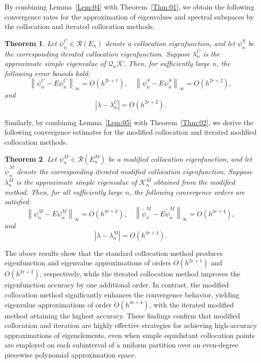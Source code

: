 \documentclass[]{interact}
\theoremstyle{plain}%
\newtheorem{theorem}{Theorem}[section]
\theoremstyle{definition}
\theoremstyle{remark}
\newcommand{\norm}[1]{\left\lVert #1\right\rVert}
\begin{document}
By combining Lemma~\ref{Lem:04} with Theorem~\ref{Thm:01},  we obtain the following convergence rates for the approximation of eigenvalues and spectral subspaces by the collocation and iterated collocation methods.
\begin{theorem} \label{thm1}
	Let \(\psi_n^C \in \mathcal{R}(E_n)\) denote a collocation eigenfunction, and let \(\psi_n^S\) be the corresponding iterated collocation eigenfunction. Suppose \(\lambda_n^C\) is the approximate simple eigenvalue of \(\mathcal{Q}_n\mathcal{K}\). Then, for sufficiently large \(n\), the following error bounds hold:
	\[	
	\norm{\psi_n^C - E\psi_n^C  }_{\infty} = O\left(h^{2r +1}\right), \quad 	\norm{\psi_n^S - E\psi_n^S  }_{\infty} = O\left(h^{2r +2}\right),
	\]
	and
	\[	
	|\lambda - \lambda_n^C| = O\left(h^{2r +2}\right).
	\]
\end{theorem}

Similarly, by combining Lemma~\ref{Lem:05} with Theorem~\ref{Thm:02}, we derive the following convergence estimates for the modified collocation and iterated modified collocation methods.
\begin{theorem} \label{thm2}
	Let \(\psi_n^M \in \mathcal{R}(E_n^M)\) be a modified collocation eigenfunction, and let \(\widetilde{\psi}_n^M\) denote the corresponding iterated modified collocation eigenfunction. Suppose \(\lambda_n^M\) is the approximate simple eigenvalue of \(\mathcal{K}_n^M\) obtained from the modified method. Then, for all sufficiently large \(n\), the following convergence orders are satisfied:
	\[	
	\norm{\psi_n^M - E\psi_n^M }_{\infty}  = O\left(h^{4r+3}\right), \quad 	\norm{\widetilde{\psi}_n^M - E\widetilde{\psi}_n^M }_{\infty} = O\left(h^{4r+4}\right),
	\]
	and
	\[
	|\lambda - \lambda_n^M| = O\left(h^{4r+4}\right).
	\]
\end{theorem}

\noindent
The above results show that the standard collocation method produces eigenfunction and eigenvalue approximations of orders $O(h^{2r+1})$ and $O(h^{2r+2})$, respectively, while the iterated collocation method improves the eigenfunction accuracy by one additional order. In contrast, the modified collocation method significantly enhances the convergence behavior, yielding eigenvalue approximations of order $O(h^{4r+4})$, with the iterated modified method attaining the highest accuracy. These findings confirm that modified collocation  and iteration are highly effective strategies for achieving high-accuracy approximations of eigenelements, even when simple equidistant collocation points are employed on each subinterval of a uniform partition over an even-degree piecewise polynomial approximation space.
\end{document}
